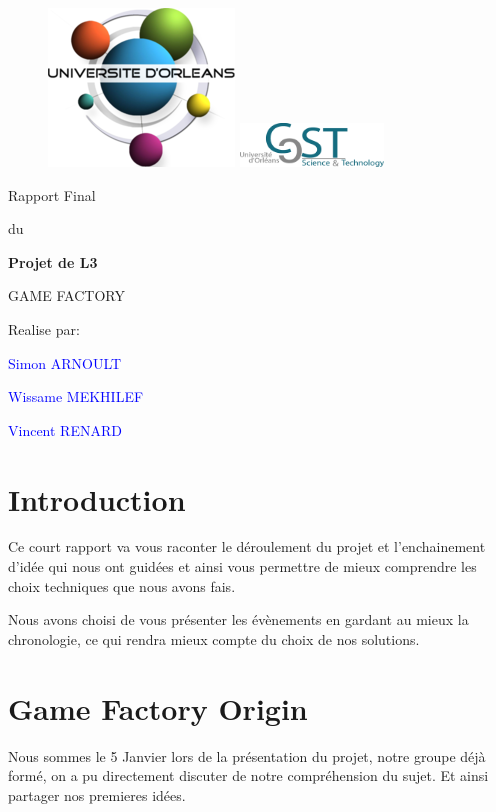 \documentclass[french,12pt]{article}
\newcommand{\ml}[0]{\par\noindent}
\begin{document}
\thispagestyle{empty}
%
\begin{figure}[H]
\includegraphics[width=0.2\linewidth]{logo_univ.png}
\hfill
\includegraphics[width=1.5in]{logo_ufr.png}
\end{figure}
\vspace{2cm}
%
\begin{center}
{\Huge Rapport Final}
\par\vspace{0.4cm}
{\Large du}
\par\vspace{0.cm}
{\Huge\bf Projet de L3}
\par\vspace{3cm}
{\Huge       GAME FACTORY}
\par\vspace{3cm}
{\Huge       Realise par:}
\par\vspace{0.3cm}
{\Huge\bf \textcolor{blue}{Simon ARNOULT \ml Wissame MEKHILEF \ml\ml Vincent RENARD}}
\end{center}
\newpage
\tableofcontents
\newpage


\section{Introduction}

Ce court rapport va vous raconter le déroulement du projet  et l'enchainement d'idée qui nous ont guidées et ainsi vous permettre de mieux comprendre les choix techniques que nous avons fais.

Nous avons choisi de vous présenter les évènements en gardant au mieux la chronologie, ce qui rendra mieux compte du choix de nos solutions.

\section{Game Factory Origin}

Nous sommes le 5 Janvier lors de la présentation du projet, notre groupe déjà formé, on a pu directement discuter de notre compréhension du sujet. Et ainsi partager nos premieres idées. 
\end{document}
